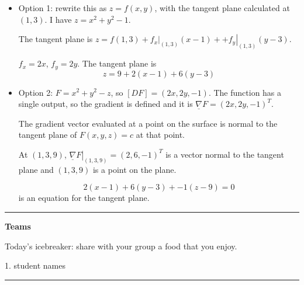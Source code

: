 \documentclass[12pt,letterpaper,noanswers]{exam}
\newcommand{\mb}[1]{\underline{#1}}
\begin{document}
\begin{itemize}
    \item Option 1: rewrite this as $z = f(x,y)$, with the tangent plane calculated at $(1,3)$. I have $z = x^2+y^2 -1$.  
    
    The tangent plane is $z = f(1,3) + \left. f_x\right\vert_{(1,3)}(x-1) + + \left. f_y\right\vert_{(1,3)}(y-3)$.
    
    $f_x = 2x$, $f_y = 2y$.  The tangent plane is
    \[z = 9 + 2(x-1) + 6(y-3)\]
    \item Option 2: $F = x^2 + y^2 - z$, so $[DF] = (2x, 2y, -1)$.  The function has a single output, so the gradient is defined and it is $\mb{\nabla}F = (2x, 2y, -1)^T$.  
    
    The gradient vector evaluated at a point on the surface is normal to the tangent plane of $F(x,y,z) = c$ at that point.
    
    At $(1,3,9)$, $\left.\mb{\nabla}F\right\vert_{(1,3,9)} = (2, 6, -1)^T$ is a vector normal to the tangent plane and $(1,3,9)$ is a point on the plane.
    
    \[2(x-1) + 6(y-3) + -1(z-9) = 0\] is an equation for the tangent plane.
\end{itemize}

\vspace{0.2cm}
\hrule
\vspace{0.2cm}


\noindent\textbf{Teams}

Today's icebreaker: share with your group a food that you enjoy.

\begin{multicols}{2}
1.  student names


\end{multicols}

\hrule
\vspace{0.2cm}
\end{document}
